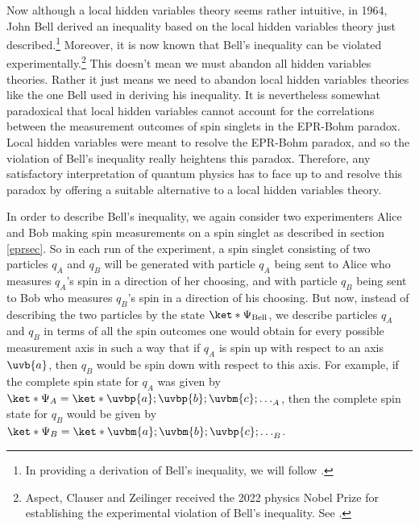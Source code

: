 \documentclass[12pt]{report}
\begin{document}
Now although a local hidden variables theory seems rather intuitive, in 1964, John Bell derived an inequality based on the local hidden variables theory just described.\footnote{In providing a derivation of Bell's inequality, we will follow \cite[241-249]{Sakurai}.} Moreover, it is now known that Bell's inequality can be violated experimentally.\footnote{Aspect, Clauser and Zeilinger received the 2022 physics Nobel Prize for establishing the experimental violation of Bell's inequality. See \cite{Nobel2022}.} This doesn't mean we must abandon all hidden variables theories. Rather it just means we need to abandon local hidden variables theories like the one Bell used in deriving his inequality.  It is nevertheless somewhat paradoxical that local hidden variables cannot account for the correlations between the measurement outcomes of spin singlets in the EPR-Bohm paradox. Local hidden variables were meant to resolve the EPR-Bohm paradox, and so the violation of Bell's inequality really heightens this paradox. Therefore, any satisfactory interpretation of quantum physics has to face up to and resolve this paradox by offering a suitable alternative to a local hidden variables theory. 

In order to describe Bell's inequality, we again consider two experimenters Alice and Bob making spin measurements on a spin singlet as described in section \ref{eprsec}. So in each run of the experiment, a spin singlet consisting of two particles $q_A$ and $q_B$ will be generated with particle $q_A$ being sent to Alice who measures $q_A$'s spin in a direction of her choosing, and with particle $q_B$ being sent to Bob who measures $q_B$'s spin in a direction of his choosing.  But now, instead of describing the two particles by the state $\ket*{\Psi_{\text{Bell}}}$, we describe particles $q_A$ and $q_B$ in terms of all the spin outcomes one would obtain for every possible measurement axis in such a way that if $q_A$ is spin up with respect to an axis $\uvb{a}$, then $q_B$ would be spin down with respect to this axis. For example, if the complete spin state for $q_A$ was given by $\ket*{\Psi_A}=\ket*{\uvbp{a};\uvbp{b};\uvbm{c};\ldots}_A$, then the complete spin state for $q_B$ would be given by $\ket*{\Psi_B}=\ket*{\uvbm{a};\uvbm{b};\uvbp{c};\ldots}_B$.
\end{document}
